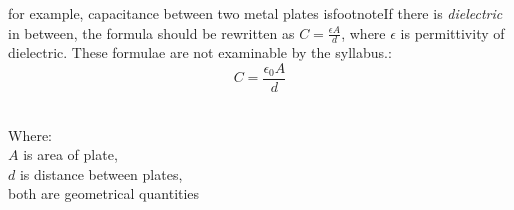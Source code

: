\documentclass[a4paper,12pt]{book}
\newcounter{example}[chapter]
\renewcommand{\theexample}{\arabic{chapter}.\arabic{example}}
\newcommand{\example}[1]{%
	\refstepcounter{example}
	\noindent {\textcolor{cyan}{\textsf{\textbf{Example \theexample }}} \hspace*{1pt} #1 %
	} \vspace{5pt}}
\newenvironment{soln}
  {\centering
  	\vspace*{6pt}
  	\begin{tcolorbox}[colframe=Gray,colback=LightGreen!15]
  \setlength{\baselineskip}{\baselineskip}%
  }
  {\end{tcolorbox}\vspace*{-4pt}}
\newcommand{\keypoint}[1]{\textbf{\textcolor{red}{#1}}}
\newcommand{\ec}{4\pi\epsilon_0}
\newcommand{\RA}{\Rightarrow\;}
\newcommand{\tcbhighmath}[1]{\boxed{#1}}
\newcommand{\keypoint}[1]{\textbf{\textcolor{red}{#1}}}
\begin{document}
for example, capacitance between two metal plates isfootnote{If there is \emph{dielectric} in between, the formula should be rewritten as $C = \frac{\epsilon A}{d}$, where $\epsilon$ is permittivity of dielectric. These formulae are not examinable by the syllabus.}: $$\tcbhighmath{C=\frac{\epsilon_0 A}{d}}$$\

Where:\\
$A$ is area of plate, \\
$d$ is distance between plates, \\
both are geometrical quantities











\end{document}
